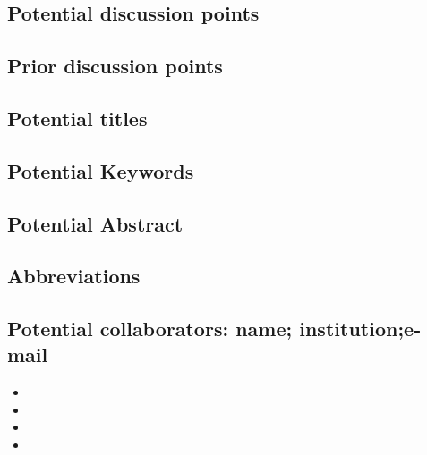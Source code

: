 \documentclass[11pt,letterpaper]{article}
\begin{document}
\subsection{Potential discussion points}
\label{sec:org4ac6bc1}



\subsection{Prior discussion points}
\label{sec:org750c544}

\subsection{Potential titles}
\label{sec:orgecfef6e}




\subsection{Potential Keywords}
\label{sec:orge9d69b1}



\subsection{Potential Abstract}
\label{sec:org313b688}


\subsection{Abbreviations}
\label{sec:org4790ab3}


\subsection{Potential collaborators: name; institution;e-mail}
\label{sec:org153342f}


\begin{itemize}
\item 

\item 

\item 

\item 
\end{itemize}
\end{document}
